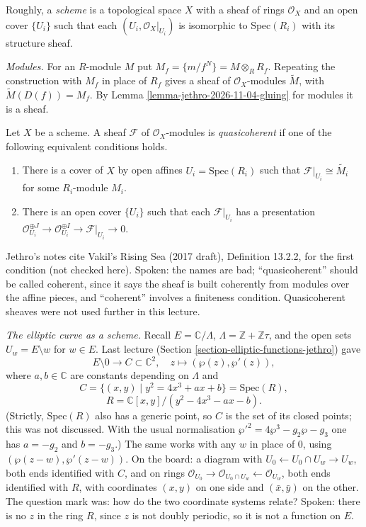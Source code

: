 \begin{definition}
\label{definition-scheme-jethro}
Roughly, a \textit{scheme} is a topological
space $X$ with a sheaf of rings
$\mathcal{O}_X$ and an open cover $\{U_i\}$
such that each $(U_i,\mathcal{O}_X|_{U_i})$
is isomorphic to $\mathrm{Spec}(R_i)$ with
its structure sheaf.
\end{definition}

\textit{Modules.} For an $R$-module $M$ put
$M_f=\{m/f^N\}=M\otimes_RR_f$. Repeating the
construction with $M_f$ in place of $R_f$
gives a sheaf of $\mathcal{O}_X$-modules
$\widetilde{M}$, with
$\widetilde{M}(D(f))=M_f$. By Lemma
\ref{lemma-jethro-2026-11-04-gluing} for
modules it is a sheaf.

\begin{definition}
\label{definition-quasicoherent-sheaf-jethro}
Let $X$ be a scheme. A sheaf $\mathcal{F}$ of
$\mathcal{O}_X$-modules is
\textit{quasicoherent} if one of the
following equivalent conditions holds.
\begin{enumerate}
\item There is a cover of $X$ by open affines
$U_i=\mathrm{Spec}(R_i)$ such that
$\mathcal{F}|_{U_i}\cong\widetilde{M_i}$ for
some $R_i$-module $M_i$.
\item There is an open cover $\{U_i\}$ such
that each $\mathcal{F}|_{U_i}$ has a
presentation $\mathcal{O}_{U_i}^{\oplus J}\to
\mathcal{O}_{U_i}^{\oplus I}\to
\mathcal{F}|_{U_i}\to 0$.
\end{enumerate}
\end{definition}

Jethro's notes cite Vakil's Rising Sea
\cite{sea} (2017 draft), Definition 13.2.2,
for the first condition
(not checked here). Spoken: the names are
bad; ``quasicoherent'' should be called
coherent, since it says the sheaf is built
coherently from modules over the affine
pieces, and ``coherent'' involves a
finiteness condition. Quasicoherent sheaves
were not used further in this lecture.

\textit{The elliptic curve as a scheme.}
Recall $E=\mathbb{C}/\Lambda$,
$\Lambda=\mathbb{Z}+\mathbb{Z}\tau$, and the
open sets $U_w=E\setminus w$ for $w\in E$.
Last lecture (Section
\ref{section-elliptic-functions-jethro})
gave
$$
E\setminus 0\to C\subset\mathbb{C}^2,\quad
z\mapsto(\wp(z),\wp'(z)),
$$
where $a,b\in\mathbb{C}$ are constants
depending on $\Lambda$ and
$$
C=\{(x,y)\mid y^2=4x^3+ax+b\}
=\mathrm{Spec}(R),
$$
$$
R=\mathbb{C}[x,y]/(y^2-4x^3-ax-b).
$$
(Strictly, $\mathrm{Spec}(R)$ also has a
generic point, so $C$ is the set of its
closed points; this was not discussed. With
the usual normalisation
$\wp'^2=4\wp^3-g_2\wp-g_3$ one has $a=-g_2$
and $b=-g_3$.) The same works with any $w$ in
place of $0$, using $(\wp(z-w),\wp'(z-w))$.
On the board: a diagram with $U_0\leftarrow
U_0\cap U_w\to U_w$, both ends identified
with $C$, and on rings $\mathcal{O}_{U_0}\to
\mathcal{O}_{U_0\cap U_w}\leftarrow
\mathcal{O}_{U_w}$, both ends identified with
$R$, with coordinates $(x,y)$ on one side and
$(\bar x,\bar y)$ on the other. The question
mark was: how do the two coordinate systems
relate? Spoken: there is no $z$ in the ring
$R$, since $z$ is not doubly periodic, so it
is not a function on $E$.

